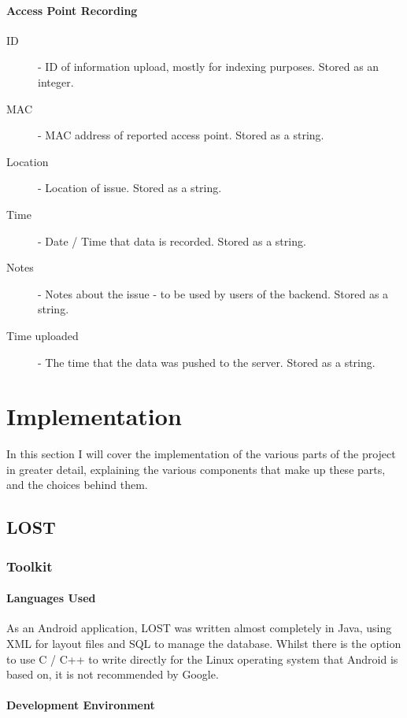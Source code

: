 \documentclass[11pt]{informatics-report}
\begin{document}
\subsubsection{Access Point Recording}
\begin{description}
\item[ID] - ID of information upload, mostly for indexing purposes. Stored as an integer.
\item[MAC] - MAC address of reported access point. Stored as a string.
\item[Location] - Location of issue. Stored as a string.
\item[Time] - Date / Time that data is recorded. Stored as a string.
\item[Notes] - Notes about the issue - to be used by users of the backend. Stored as a string.
\item[Time uploaded] - The time that the data was pushed to the server. Stored as a string.
\end{description}

\chapter{Implementation}

In this section I will cover the implementation of the various parts of the project in greater detail, explaining the various components that make up these parts, and the choices behind them.

\section{LOST}

\subsection{Toolkit}

\subsubsection{Languages Used}
As an Android application, LOST was written almost completely in Java, using XML for layout files and SQL to manage the database. Whilst there is the option to use C / C++ to write directly for the Linux operating system that Android is based on, it is not recommended by Google.

\subsubsection{Development Environment}
\end{document}
